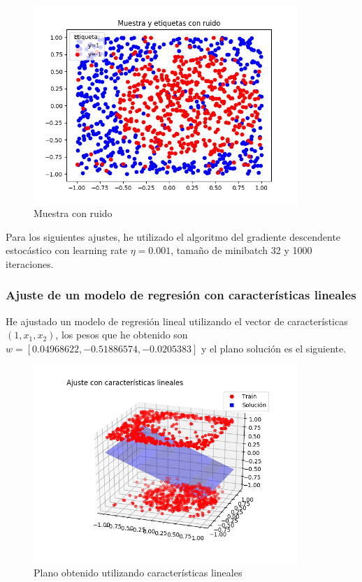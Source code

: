 \documentclass[a4]{article}
\begin{document}
\begin{figure}[H]
    \centering    
    \includegraphics[width=100mm]{imgs/sample-noise.png}
    \caption{Muestra con ruido}
    \label{fig:sample-noise}
\end{figure} 

\vspace{-5mm}

Para los siguientes ajustes, he utilizado el algoritmo del gradiente descendente
estocástico con learning rate $\eta=0.001$, tamaño de minibatch 32 y 1000 iteraciones.

\subsubsection{Ajuste de un modelo de regresión con características lineales}
He ajustado un modelo de regresión lineal utilizando el vector de características
$(1,x_1,x_2)$, los pesos que he obtenido son $w=[0.04968622,-0.51886574,-0.0205383]$ y el plano solución es el siguiente. \vspace{-4mm}

\begin{figure}[H]
    \centering    
    \includegraphics[width=100mm]{imgs/regress-lin.png}
    \caption{Plano obtenido utilizando características lineales}
    \label{fig:regress-lin}
\end{figure}
\end{document}
